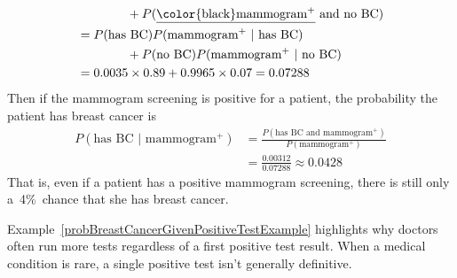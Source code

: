 \begin{examplewrap}
\begin{nexample}
\begin{align*}
  &\qquad\qquad
      + P(\text{\underline{\color{black}mammogram$^+$} and no BC})\\
  &= P(\text{has BC})P(\text{mammogram$^+$ } | \text{ has BC}) \\
  &\qquad\qquad
      + P(\text{no BC})P(\text{mammogram$^+$ } | \text{ no BC}) \\
  &= 0.0035\times 0.89 + 0.9965\times 0.07 = 0.07288
\end{align*}
Then if the mammogram screening is positive for a patient, the probability the patient has breast cancer is
\begin{align*}
P(\text{has BC } | \text{ mammogram$^+$})
	&= \frac{P(\text{has BC and mammogram$^+$})}{P(\text{mammogram$^+$})}\\
	&= \frac{0.00312}{0.07288} \approx 0.0428
\end{align*}
That is, even if a patient has a positive mammogram screening, there is still only a~4\%~chance that she has breast cancer.
\end{nexample}
\end{examplewrap}


\D{\newpage}

Example~\ref{probBreastCancerGivenPositiveTestExample} highlights why doctors often run more tests regardless of a first positive test result. When a medical condition is rare, a single positive test isn't generally definitive.

